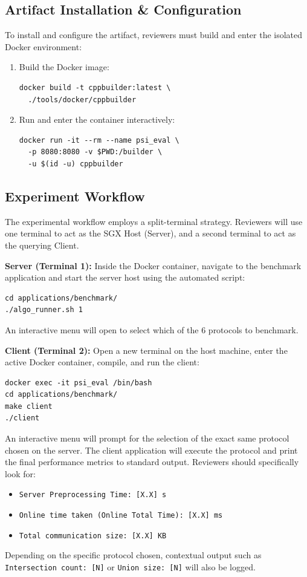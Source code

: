 \documentclass[conference]{IEEEtran}
\begin{document}
\subsection{Artifact Installation \& Configuration}
To install and configure the artifact, reviewers must build and enter the isolated Docker environment:

\begin{enumerate}
    \item Build the Docker image:
    \begin{verbatim}
docker build -t cppbuilder:latest \
  ./tools/docker/cppbuilder
    \end{verbatim}
    \item Run and enter the container interactively:
    \begin{verbatim}
docker run -it --rm --name psi_eval \
  -p 8080:8080 -v $PWD:/builder \
  -u $(id -u) cppbuilder
    \end{verbatim}
\end{enumerate}


\subsection{Experiment Workflow}
The experimental workflow employs a split-terminal strategy. Reviewers will use one terminal to act as the SGX Host (Server), and a second terminal to act as the querying Client.

\textbf{Server (Terminal 1):} Inside the Docker container, navigate to the benchmark application and start the server host using the automated script:
\begin{verbatim}
cd applications/benchmark/
./algo_runner.sh 1
\end{verbatim}
An interactive menu will open to select which of the 6 protocols to benchmark.

\textbf{Client (Terminal 2):} Open a new terminal on the host machine, enter the active Docker container, compile, and run the client:
\begin{verbatim}
docker exec -it psi_eval /bin/bash
cd applications/benchmark/
make client
./client
\end{verbatim}
An interactive menu will prompt for the selection of the exact same protocol chosen on the server. The client application will execute the protocol and print the final performance metrics to standard output. Reviewers should specifically look for:
\begin{itemize}
    \item \texttt{Server Preprocessing Time: [X.X] s}
    \item \texttt{Online time taken (Online Total Time): [X.X] ms}
    \item \texttt{Total communication size: [X.X] KB}
\end{itemize}
Depending on the specific protocol chosen, contextual output such as \texttt{Intersection count: [N]} or \texttt{Union size: [N]} will also be logged.
\end{document}

